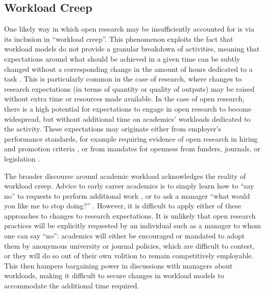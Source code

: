 \documentclass[ authordate, meta, issue]{jote-new-article}
\begin{document}
\subsection{Workload Creep}



One likely way in which open research may be insufficiently accounted for is via its inclusion in “workload creep”. This phenomenon exploits the fact that workload models do not provide a granular breakdown of activities, meaning that expectations around what should be achieved in a given time can be subtly changed without a corresponding change in the amount of hours dedicated to a task \parencites{Long2020}. This is particularly common in the case of research, where changes to research expectations (in terms of quantity or quality of outputs) may be raised without extra time or resources made available. In the case of open research, there is a high potential for expectations to engage in open research to become widespread, but without additional time on academics’ workloads dedicated to the activity. These expectations may originate either from employer’s performance standards, for example requiring evidence of open research in hiring and promotion criteria \parencites{Gärtner2022}{Robson2021}, or from mandates for openness from funders, journals, or legislation \parencites{Nosek2019}.



The broader discourse around academic workload acknowledges the reality of workload creep. Advice to early career academics is to simply learn how to “say no” to requests to perform additional work \parencites{Somerville2021}, or to ask a manager “what would you like me to stop doing?” \parencites{Williams2022}. However, it is difficult to apply either of these approaches to changes to research expectations. It is unlikely that open research practices will be explicitly requested by an individual such as a manager to whom one can say “no”: academics will either be encouraged or mandated to adopt them by anonymous university or journal policies, which are difficult to contest, or they will do so out of their own volition to remain competitively employable. This then hampers bargaining power in discussions with managers about workloads, making it difficult to secure changes in workload models to accommodate the additional time required.
\end{document}
